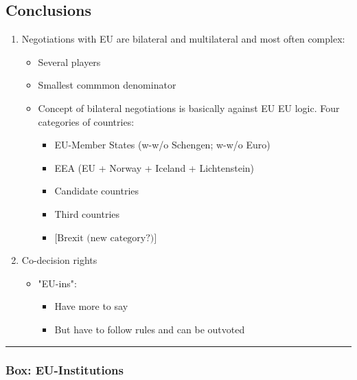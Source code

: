 \subsection{Conclusions}

\begin{enumerate}
    \item Negotiations with EU are bilateral and multilateral and most often
        complex:
        \begin{itemize}
            \item Several players
            \item Smallest commmon denominator
            \item Concept of bilateral negotiations is basically against EU
                EU logic. Four categories of countries:
                \begin{itemize}
                    \item EU-Member States (w-w/o Schengen; w-w/o Euro)
                    \item EEA (EU + Norway + Iceland + Lichtenstein)
                    \item Candidate countries
                    \item Third countries
                    \item $\text{[Brexit (new category?)]}$
                \end{itemize}
        \end{itemize}
    \item Co-decision rights
        \begin{itemize}
            \item "EU-ins":
                \begin{itemize}
                    \item Have more to say
                    \item But have to follow rules and can be outvoted
                \end{itemize}
        \end{itemize}
\end{enumerate}

\pagebreak

\hrule

\subsubsection{Box: EU-Institutions}

